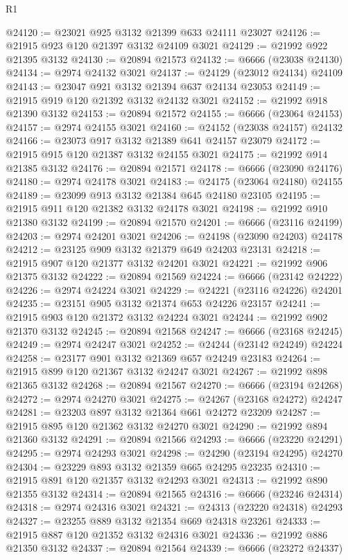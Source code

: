 \begin{lexlean}{R1}
\begin{coremodule}
@24120 := @23021 @925 @3132 @21399 @633 @24111 @23027
@24126 := @21915 @923 @120 @21397 @3132 @24109 @3021
@24129 := @21992 @922 @21395 @3132
@24130 := @20894 @21573
@24132 := @6666 (@23038 @24130)
@24134 := @2974 @24132 @3021
@24137 := @24129 (@23012 @24134) @24109
@24143 := @23047 @921 @3132 @21394 @637 @24134 @23053
@24149 := @21915 @919 @120 @21392 @3132 @24132 @3021
@24152 := @21992 @918 @21390 @3132
@24153 := @20894 @21572
@24155 := @6666 (@23064 @24153)
@24157 := @2974 @24155 @3021
@24160 := @24152 (@23038 @24157) @24132
@24166 := @23073 @917 @3132 @21389 @641 @24157 @23079
@24172 := @21915 @915 @120 @21387 @3132 @24155 @3021
@24175 := @21992 @914 @21385 @3132
@24176 := @20894 @21571
@24178 := @6666 (@23090 @24176)
@24180 := @2974 @24178 @3021
@24183 := @24175 (@23064 @24180) @24155
@24189 := @23099 @913 @3132 @21384 @645 @24180 @23105
@24195 := @21915 @911 @120 @21382 @3132 @24178 @3021
@24198 := @21992 @910 @21380 @3132
@24199 := @20894 @21570
@24201 := @6666 (@23116 @24199)
@24203 := @2974 @24201 @3021
@24206 := @24198 (@23090 @24203) @24178
@24212 := @23125 @909 @3132 @21379 @649 @24203 @23131
@24218 := @21915 @907 @120 @21377 @3132 @24201 @3021
@24221 := @21992 @906 @21375 @3132
@24222 := @20894 @21569
@24224 := @6666 (@23142 @24222)
@24226 := @2974 @24224 @3021
@24229 := @24221 (@23116 @24226) @24201
@24235 := @23151 @905 @3132 @21374 @653 @24226 @23157
@24241 := @21915 @903 @120 @21372 @3132 @24224 @3021
@24244 := @21992 @902 @21370 @3132
@24245 := @20894 @21568
@24247 := @6666 (@23168 @24245)
@24249 := @2974 @24247 @3021
@24252 := @24244 (@23142 @24249) @24224
@24258 := @23177 @901 @3132 @21369 @657 @24249 @23183
@24264 := @21915 @899 @120 @21367 @3132 @24247 @3021
@24267 := @21992 @898 @21365 @3132
@24268 := @20894 @21567
@24270 := @6666 (@23194 @24268)
@24272 := @2974 @24270 @3021
@24275 := @24267 (@23168 @24272) @24247
@24281 := @23203 @897 @3132 @21364 @661 @24272 @23209
@24287 := @21915 @895 @120 @21362 @3132 @24270 @3021
@24290 := @21992 @894 @21360 @3132
@24291 := @20894 @21566
@24293 := @6666 (@23220 @24291)
@24295 := @2974 @24293 @3021
@24298 := @24290 (@23194 @24295) @24270
@24304 := @23229 @893 @3132 @21359 @665 @24295 @23235
@24310 := @21915 @891 @120 @21357 @3132 @24293 @3021
@24313 := @21992 @890 @21355 @3132
@24314 := @20894 @21565
@24316 := @6666 (@23246 @24314)
@24318 := @2974 @24316 @3021
@24321 := @24313 (@23220 @24318) @24293
@24327 := @23255 @889 @3132 @21354 @669 @24318 @23261
@24333 := @21915 @887 @120 @21352 @3132 @24316 @3021
@24336 := @21992 @886 @21350 @3132
@24337 := @20894 @21564
@24339 := @6666 (@23272 @24337)

\end{coremodule}
\end{lexlean}

